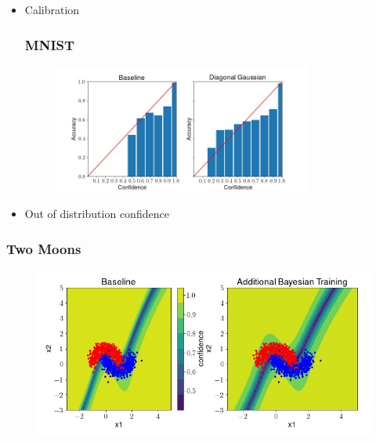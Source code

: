 \documentclass{beamer}
\begin{document}
        
        \begin{frame}
            
            \begin{itemize}
                \item  Calibration\\
                    \frametitle{MNIST}
                    \begin{figure}
                        \includegraphics[width=0.8\textwidth]{images/MNIST/calibration.jpg}
                    \end{figure}
                \item Out of distribution confidence \\[10pt]
                    \centering

            \end{itemize}
        \end{frame}
        
        
        \begin{frame}
            \frametitle{Two Moons}
            \begin{figure}
                \includegraphics[width=\textwidth]{images/TwoMoons/comparison.jpg}
            \end{figure}
        \end{frame}
        
\end{document}
